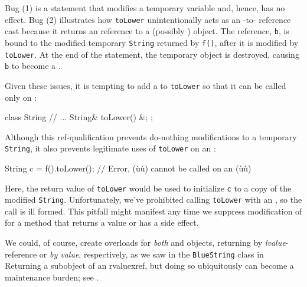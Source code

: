 \noindent Bug (1) is a statement that modifies a temporary variable and, hence,
has no effect. Bug (2) illustrates how \lstinline!toLower! unintentionally
acts as an -to- reference cast because it
returns an  reference to a (possibly ) object.
The  reference, \lstinline!b!, is bound to the modified
temporary \lstinline!String! returned by \lstinline!f()!, after it is modified
by \lstinline!toLower!. At the end of the statement, the temporary object
is destroyed, causing \lstinline!b! to become a .

Given these issues, it is tempting to add a  to
\lstinline!toLower! so that it can be called only on :

\begin{emcppslisting}
class String
{
    // ...
    String& toLower() &;
};
\end{emcppslisting}
    

\noindent Although this ref-qualification prevents do-nothing modifications to a
temporary \lstinline!String!, it also prevents legitimate uses of
\lstinline!toLower! on an :

\begin{emcppslisting}
String c = f().toLower();  // Error, (ù{}ù) cannot be called on an (ù{}ù)
\end{emcppslisting}
    

\noindent Here, the return value of \lstinline!toLower! would be used to initialize
\lstinline!c! to a copy of the modified \lstinline!String!. Unfortunately,
we've prohibited calling \lstinline!toLower! with an , so the
call is ill formed. This pitfall might manifest any time we suppress
modification of  for a method that returns a value or has
a side effect.

We could, of course, create  overloads for
\emph{both}  and  objects, returning by
\emph{lvalue}-reference or \emph{by value}, respectively, as we saw in
the \lstinline!BlueString! class in  {Returning a subobject of an
rvalue}{xref}, but doing so ubiquitously can become a maintenance
burden; see .

